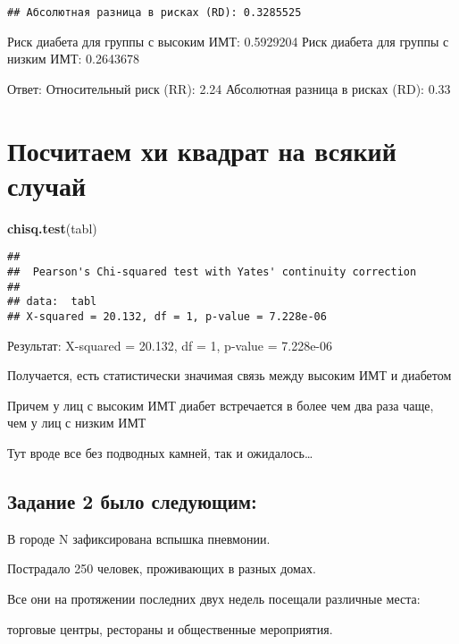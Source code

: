 \documentclass[
]{article}
\newenvironment{Shaded}{\begin{snugshade}}{\end{snugshade}}
\newcommand{\FunctionTok}[1]{\textcolor[rgb]{0.13,0.29,0.53}{\textbf{#1}}}
\newcommand{\NormalTok}[1]{#1}
\begin{document}
\begin{verbatim}
## Абсолютная разница в рисках (RD): 0.3285525
\end{verbatim}

Риск диабета для группы с высоким ИМТ: 0.5929204 Риск диабета для группы
с низким ИМТ: 0.2643678

Ответ: Относительный риск (RR): 2.24 Абсолютная разница в рисках (RD):
0.33

\section{Посчитаем хи квадрат на всякий
случай}\label{ux43fux43eux441ux447ux438ux442ux430ux435ux43c-ux445ux438-ux43aux432ux430ux434ux440ux430ux442-ux43dux430-ux432ux441ux44fux43aux438ux439-ux441ux43bux443ux447ux430ux439}

\begin{Shaded}
\begin{Highlighting}[]
\FunctionTok{chisq.test}\NormalTok{(tabl)}
\end{Highlighting}
\end{Shaded}

\begin{verbatim}
## 
##  Pearson's Chi-squared test with Yates' continuity correction
## 
## data:  tabl
## X-squared = 20.132, df = 1, p-value = 7.228e-06
\end{verbatim}

Результат: X-squared = 20.132, df = 1, p-value = 7.228e-06

Получается, есть статистически значимая связь между высоким ИМТ и
диабетом

Причем у лиц с высоким ИМТ диабет встречается в более чем два раза чаще,
чем у лиц с низким ИМТ

Тут вроде все без подводных камней, так и ожидалось\ldots{}

\subsection{Задание 2 было
следующим:}\label{ux437ux430ux434ux430ux43dux438ux435-2-ux431ux44bux43bux43e-ux441ux43bux435ux434ux443ux44eux449ux438ux43c}

В городе N зафиксирована вспышка пневмонии.

Пострадало 250 человек, проживающих в разных домах.

Все они на протяжении последних двух недель посещали различные места:

торговые центры, рестораны и общественные мероприятия.
\end{document}
